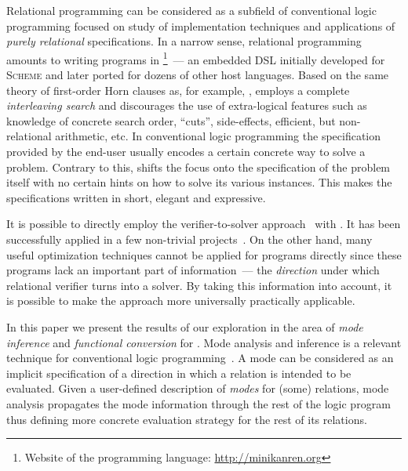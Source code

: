Relational programming can be considered as a subfield of conventional logic programming focused on study of implementation techniques and applications of \emph{purely relational} specifications.
In a narrow sense, relational programming amounts to writing programs in \mk\footnote{Website of the \mk programming language: \url{http://minikanren.org}}~--- an embedded DSL initially developed for \textsc{Scheme} and later ported for dozens of other host languages.
Based on the same theory of first-order Horn clauses as, for example, \prolog, \mk employs a complete \emph{interleaving search}\cite{kiselyov2005backtracking, rozplokhas2020certified} and discourages the use of extra-logical features such as knowledge of concrete search order, ``cuts'', side-effects, efficient, but non-relational arithmetic, etc.
In conventional logic programming the specification provided by the end-user usually encodes a certain concrete way to solve a problem.
Contrary to this, \mk shifts the focus onto the specification of the problem itself with no certain hints on how to solve its various instances.
This makes the specifications written in \mk short, elegant and expressive.

It is possible to directly employ the verifier-to-solver approach~\cite{byrd2017unified,kosarev2020relational} with \mk.
It has been successfully applied in a few non-trivial projects~\cite{kosarev2022declarative,lozov2023relational}.
On the other hand, many useful optimization techniques cannot be applied for \mk programs directly since these programs lack an important part of information~--- the \emph{direction} under which relational verifier turns into a solver.
By taking this information into account, it is possible to make the approach more universally practically applicable.

In this paper we present the results of our exploration in the area of \emph{mode inference} and \emph{functional conversion} for \mk.
Mode analysis and inference is a relevant technique for conventional logic programming~\cite{debray1988automatic,somogyi1987system,overton2002constraint}.
A mode can be considered as an implicit specification of a direction in which a relation is intended to be evaluated.
Given a user-defined description of \emph{modes} for (some) relations, mode analysis propagates the mode information through the rest of the logic program thus defining more concrete evaluation strategy for the rest of its relations.

